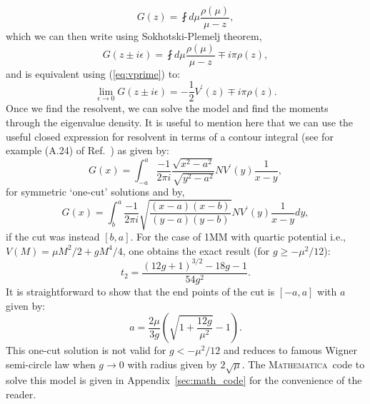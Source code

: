 \documentclass[11pt]{article}
\newcommand{\MA}{\textsc{Mathematica}}
\begin{document}
\begin{equation}
	G(z) = \fint d\mu \frac{\rho(\mu)}{\mu - z},
\end{equation}
which we can then write using Sokhotski-Plemelj theorem,
\begin{equation}
	G(z \pm i \epsilon) = \fint d\mu \frac{\rho(\mu)}{\mu - z} \mp i\pi \rho(z),  
\end{equation}
and is equivalent using (\ref{eq:vprime}) to: 
\begin{equation}
	\lim_{\epsilon \to 0} G(z \pm i \epsilon) = -\frac{1}{2} V^{\prime}(z) \mp i\pi \rho(z).  
\end{equation}
Once we find the resolvent, we can solve the model and find the moments through the eigenvalue density. 
It is useful to mention here that we can use the useful closed expression for 
resolvent in terms of a contour integral (see for example (A.24) of Ref.~\cite{Migdal:1983qrz})
as given by:
\begin{equation}
	G(x) = \int_{-a}^{a} \frac{-1}{2\pi i} \frac{\sqrt{x^2-a^2}}{\sqrt{y^2-a^2}} N V^{\prime}(y) \frac{1}{x-y}, 
\end{equation}
for symmetric `one-cut' solutions and by,
\begin{equation}
	G(x) = \int_{b}^{a} \frac{-1}{2\pi i} \sqrt{\frac{(x-a) (x-b)}{(y-a)(y-b)}}  N V^{\prime}(y) \frac{1}{x-y} dy, 
\end{equation}
if the cut was instead $[b,a]$. For the case of 1MM with quartic potential i.e., 
$V(M) = \mu M^2/2 + gM^4/4$, one obtains the exact result (for $g \ge -\mu^2/12$):
\begin{equation}
\label{eq:exact1MM} 
t_{2} = \frac{(12 g+1)^{3/2}-18 g-1}{54 g^2}. 
\end{equation}
It is straightforward to show that the end points of the cut is $[-a,a]$ with $a$ given by:
\begin{equation}
a = \frac{2\mu}{3g} \left( \sqrt{1 + \frac{12g}{\mu^2}} - 1\right). 
\end{equation}
This one-cut solution is not valid for $g < -\mu^2/12$ and reduces to famous Wigner semi-circle
law when $g \to 0$ with radius given by $2 \sqrt{\mu}$. The \MA~code to solve 
this model is given in Appendix~\ref{sec:math_code} for the convenience of the reader. 
\end{document}
